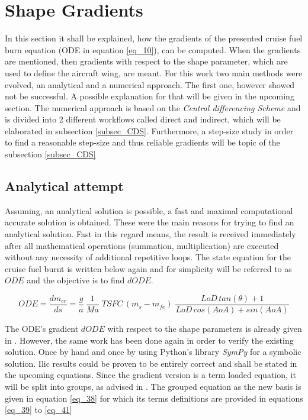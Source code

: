 
\section{Shape Gradients}
\label{sec_Shape_Gradients}
In this section it shall be explained, 
how the gradients of the 
presented cruise fuel burn equation (ODE in equation \eqref{eq_10}), 
can be computed. When the gradients are 
mentioned, then gradients with respect to 
the shape parameter, which are used to 
define the aircraft wing, are meant. For this 
work two main methods were evolved, an 
analytical and a numerical approach. The first one, however 
showed not be successful. A possible explanation for that 
will be given in the upcoming section. The numerical 
approach is based on the 
\emph{Central differencing Scheme} and is 
divided into 2 different workflows 
called direct and indirect, which will 
be elaborated in subsection \eqref{subsec_CDS}.
Furthermore, a step-size study in order to find 
a reasonable step-size and thus 
reliable gradients will be topic of the subsection 
\ref{subsec_CDS}

\subsection{Analytical attempt}
\label{subsec_Anly_Attempt}
Assuming, an analytical solution is possible, 
a fast and maximal computational accurate solution is obtained.
These were the main reasons for trying to find an 
analytical solution. Fast in this regard means, 
the result is received immediately after 
all mathematical operations (summation, multiplication) 
are executed without any necessity of additional repetitive 
loops. The state equation for the cruise fuel burnt is 
written below again and for simplicity will be referred to as  
$ODE$ and the objective is to find $dODE$.

\begin{equation*}
    ODE = \frac{dm_{cr}}{ds} = \frac{g}{a} \: \frac{1}{Ma}\;
    TSFC\, (m_s - m_{fe}) \; \frac{LoD\,tan(\theta)+1}
    {LoD\,cos(AoA) + sin(AoA)}
\end{equation*}

The ODE's gradient $dODE$ with respect to the shape 
parameters is already given in \cite{ilic_goal_2013}. However, 
the same work has been done again in order to 
verify the existing solution. Once by hand and once 
by using Python's library \emph{SymPy} for a symbolic solution.
Ilic \cite{ilic_goal_2013} results could be 
proven to be entirely correct and shall be 
stated in the upcoming equations. Since 
the gradient version is a term loaded equation, 
it will be split into groups, as advised in 
\cite{ilic_goal_2013}. The grouped 
equation as the new basis is given in equation
 \eqref{eq_38} for which its terms definitions 
 are provided in equations \eqref{eq_39}
 to \eqref{eq_41}



